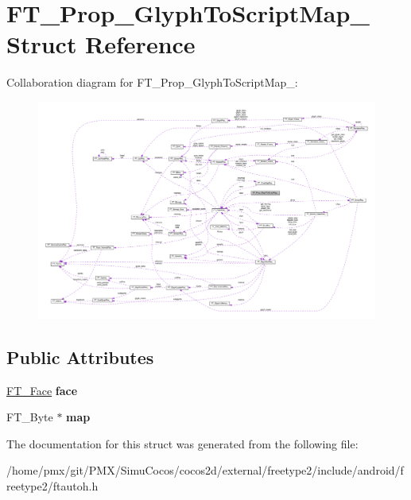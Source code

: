 \hypertarget{structFT__Prop__GlyphToScriptMap__}{}\section{F\+T\+\_\+\+Prop\+\_\+\+Glyph\+To\+Script\+Map\+\_\+ Struct Reference}
\label{structFT__Prop__GlyphToScriptMap__}


Collaboration diagram for F\+T\+\_\+\+Prop\+\_\+\+Glyph\+To\+Script\+Map\+\_\+\+:
\nopagebreak
\begin{figure}[H]
\begin{center}
\leavevmode
\includegraphics[width=350pt]{structFT__Prop__GlyphToScriptMap____coll__graph}
\end{center}
\end{figure}
\subsection*{Public Attributes}
\begin{DoxyCompactItemize}
\item 
\mbox{\label{structFT__Prop__GlyphToScriptMap___a08fa6630173f5351bf5bf8e54ab0adcf}} 
\hyperlink{structFT__FaceRec__}{F\+T\+\_\+\+Face} {\bfseries face}
\item 
\mbox{\label{structFT__Prop__GlyphToScriptMap___ab8db71f2622217097657b05cc349fe47}} 
F\+T\+\_\+\+Byte $\ast$ {\bfseries map}
\end{DoxyCompactItemize}


The documentation for this struct was generated from the following file\+:\begin{DoxyCompactItemize}
\item 
/home/pmx/git/\+P\+M\+X/\+Simu\+Cocos/cocos2d/external/freetype2/include/android/freetype2/ftautoh.\+h\end{DoxyCompactItemize}
